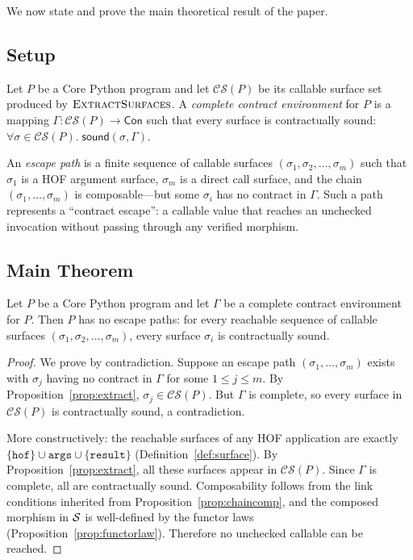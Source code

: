 \documentclass[11pt]{article}
\newcommand{\CS}{\mathcal{CS}}                 %
\newcommand{\surf}{\sigma}                     %
\newcommand{\CEnv}{\Gamma}                     %
\newcommand{\Contract}{\mathsf{Con}}           %
\newcommand{\sound}{\mathsf{sound}}            %
\begin{document}
We now state and prove the main theoretical result of the paper.

\subsection{Setup}

Let $P$ be a Core Python program and let $\CS(P)$ be its callable
surface set produced by $\textsc{ExtractSurfaces}$.  A
\emph{complete contract environment} for $P$ is a mapping
$\CEnv : \CS(P) \to \Contract$ such that every surface is
contractually sound:
$\forall \surf \in \CS(P).\; \sound(\surf, \CEnv)$.

An \emph{escape path} is a finite sequence of callable surfaces
$(\surf_1, \surf_2, \dots, \surf_m)$ such that $\surf_1$ is a
HOF argument surface, $\surf_m$ is a direct call surface, and
the chain $(\surf_1, \dots, \surf_m)$ is composable---but some
$\surf_i$ has no contract in $\CEnv$.  Such a path represents a
``contract escape'': a callable value that reaches an unchecked
invocation without passing through any verified morphism.

\subsection{Main Theorem}

\begin{theorem}\label{thm:hosound}
Let $P$ be a Core Python program and let $\CEnv$ be a complete
contract environment for $P$.  Then $P$ has no escape paths: for
every reachable sequence of callable surfaces
$(\surf_1, \surf_2, \dots, \surf_m)$, every surface $\surf_i$ is
contractually sound.
\end{theorem}

\begin{proof}
We prove by contradiction.  Suppose an escape path
$(\surf_1, \dots, \surf_m)$ exists with $\surf_j$ having no
contract in $\CEnv$ for some $1 \le j \le m$.  By
Proposition~\ref{prop:extract}, $\surf_j \in \CS(P)$.  But $\CEnv$
is complete, so every surface in $\CS(P)$ is contractually sound, a
contradiction.

More constructively: the reachable surfaces of any HOF application
are exactly $\{\texttt{hof}\} \cup \texttt{args} \cup
\{\texttt{result}\}$ (Definition~\ref{def:surface}).  By
Proposition~\ref{prop:extract}, all these surfaces appear in
$\CS(P)$.  Since $\CEnv$ is complete, all are contractually sound.
Composability follows from the link conditions inherited from
Proposition~\ref{prop:chaincomp}, and the composed morphism in
$\mathcal{S}$ is well-defined by the functor laws
(Proposition~\ref{prop:functorlaw}).  Therefore no unchecked callable
can be reached.
\end{proof}
\end{document}

